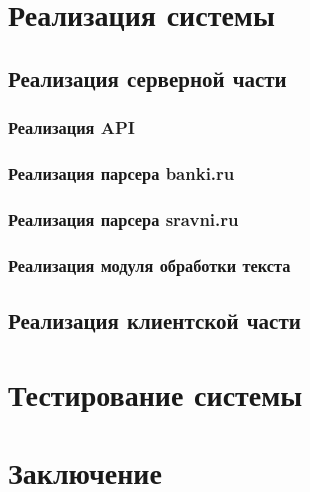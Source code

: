 \documentclass[PI, VKR]{HSEUniversity}
\begin{document}
\chapter{Реализация системы}
\label{sec:org6eb8684}
\section{Реализация серверной части}
\label{sec:org63955d5}
\subsection{Реализация API}
\label{sec:orgf53feda}
\subsection{Реализация парсера banki.ru}
\label{sec:org7e5099b}
\subsection{Реализация парсера sravni.ru}
\label{sec:org237fe7d}
\subsection{Реализация модуля обработки текста}
\label{sec:org3b6eeca}
\section{Реализация клиентской части}
\label{sec:orgd20bd1e}
\chapter{Тестирование системы}
\label{sec:org33a6c6c}
\chapter*{Заключение}
\label{sec:orgb140b13}
\putbibliography
\appendix
\end{document}

